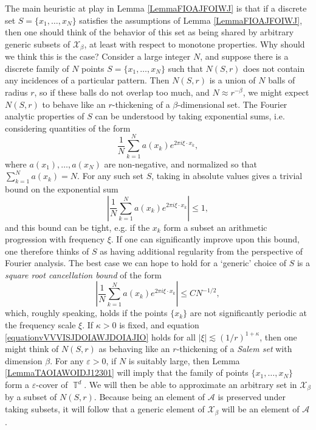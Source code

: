 \documentclass[dvipsnames,letterpaper,12pt]{article}
\numberwithin{equation}{section}
\DeclareMathOperator{\TT}{\mathbb{T}}
\numberwithin{theorem}{section}
\begin{document}
The main heuristic at play in Lemma \ref{LemmaFIOAJFOIWJ} is that if a discrete set $S = \{ x_1, \dots, x_N \}$ satisfies the assumptions of Lemma \ref{LemmaFIOAJFOIWJ}, then one should think of the behavior of this set as being shared by arbitrary generic subsets of $\mathcal{X}_\beta$, at least with respect to monotone properties. Why should we think this is the case? Consider a large integer $N$, and suppose there is a discrete family of $N$ points $S = \{ x_1, \dots, x_N \}$ such that $N(S,r)$ does not contain any incidences of a particular pattern. Then $N(S,r)$ is a union of $N$ balls of radius $r$, so if these balls do not overlap too much, and $N \approx r^{-\beta}$, we might expect $N(S,r)$ to behave like an $r$-thickening of a $\beta$-dimensional set. The Fourier analytic properties of $S$ can be understood by taking exponential sums, i.e. considering quantities of the form
%
\[ \frac{1}{N} \sum_{k = 1}^N a(x_k) e^{2 \pi i \xi \cdot x_k}, \]
%
where $a(x_1),\dots,a(x_N)$ are non-negative, and normalized so that $\sum_{k = 1}^N a(x_k) = N$. For any such set $S$, taking in absolute values gives a trivial bound on the exponential sum
%
\begin{equation}
    \left| \frac{1}{N} \sum_{k = 1}^N a(x_k) e^{2 \pi i \xi \cdot x_k} \right| \leq 1,
\end{equation}
%
and this bound can be tight, e.g. if the $x_k$ form a subset an arithmetic progression with frequency $\xi$. If one can significantly improve upon this bound, one therefore thinks of $S$ as having additional regularity from the perspective of Fourier analysis. The best case we can hope to hold for a `generic' choice of $S$ is a \emph{square root cancellation bound} of the form
%
\begin{equation} \label{equationvVVVISJDOIAWJDOIAJIO}
    \left| \frac{1}{N} \sum_{k = 1}^N a(x_k) e^{2 \pi i \xi \cdot x_k} \right| \leq C N^{-1/2},
\end{equation}
%
which, roughly speaking, holds if the points $\{ x_k \}$ are not significantly periodic at the frequency scale $\xi$. If $\kappa > 0$ is fixed, and equation \eqref{equationvVVVISJDOIAWJDOIAJIO} holds for all $|\xi| \lesssim (1/r)^{1 + \kappa}$, then one might think of $N(S,r)$ as behaving like an $r$-thickening of a \emph{Salem set} with dimension $\beta$. For any $\varepsilon > 0$, if $N$ is suitably large, then Lemma \ref{LemmaTAOIAWOIDJ12301} will imply that the family of points $\{ x_1, \dots, x_N \}$ form a $\varepsilon$-cover of $\TT^d$. We will then be able to approximate an arbitrary set in $\mathcal{X}_\beta$ by a subset of $N(S,r)$. Because being an element of $\mathcal{A}$ is preserved under taking subsets, it will follow that a generic element of $\mathcal{X}_\beta$ will be an element of $\mathcal{A}$.
\end{document}
